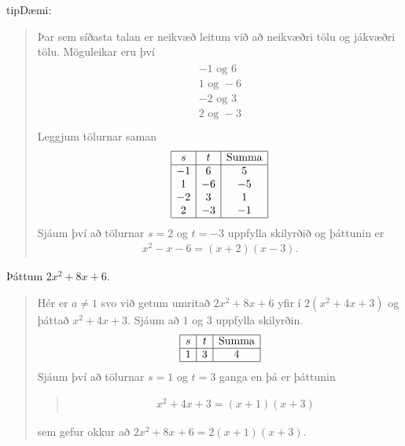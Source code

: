 \documentclass[a4paper,10pt,icelandic]{sphinxmanual}
\begin{document}
\begin{sphinxadmonition}{tip}{Dæmi:}
\begin{quote}
Þar sem síðasta talan er neikvæð leitum við að neikvæðri tölu og jákvæðri tölu. Möguleikar eru því
\begin{equation*}
\begin{split}\begin{array}{c}
-1 \text{ og } 6 \\
1 \text{ og } -6 \\
-2 \text{ og } 3 \\
2 \text{ og } -3 \\
\end{array}\end{split}
\end{equation*}
Leggjum tölurnar saman
\begin{equation*}
\begin{split}\begin{array}{ | c | c | c | }
\hline
s & t & \text{Summa} \\
\hline
-1 & 6 & 5\\
1 & -6 & -5 \\
-2 & 3 & 1\\
2 & -3 & -1\\
\hline
\end{array}\end{split}
\end{equation*}
Sjáum því að tölurnar \(s = 2\) og \(t = -3\) uppfylla skilyrðið og þáttunin er
\begin{equation*}
\begin{split}x^2-x-6=(x+2)(x-3).\end{split}
\end{equation*}\end{quote}

 Þáttum \(2x^2+8x+6\).
\begin{quote}

Hér er \(a \neq 1\) svo við getum umritað \(2x^2+8x+6\) yfir í \(2(x^2+4x+3)\) og þáttað \(x^2+4x+3\). Sjáum að \(1\) og \(3\) uppfylla skilyrðin.
\begin{equation*}
\begin{split}\begin{array}{ | c | c | c | }
\hline
s & t & \text{Summa} \\
\hline
1 & 3 & 4\\
\hline
\end{array}\end{split}
\end{equation*}
Sjáum því að tölurnar \(s = 1\) og \(t = 3\) ganga en þá er þáttunin
\begin{quote}
\begin{equation*}
\begin{split}x^2+4x+3 = (x+1)(x+3)\end{split}
\end{equation*}\end{quote}

sem gefur okkur að \(2x^2+8x+6 = 2(x+1)(x+3)\).
\end{quote}
\end{sphinxadmonition}
\end{document}
